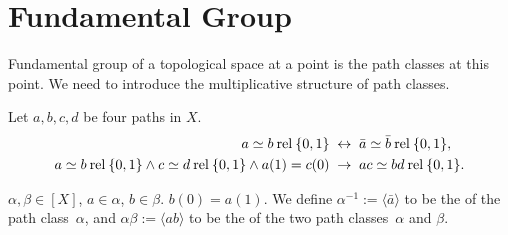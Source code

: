 \documentclass[openany, oneside, a5paper]{book}
\newcommand*{\rel}{\mathbin{\mathrm{rel}}}
\newcommand*{\pclass}[1]{\langle{#1}\rangle}    %
\begin{document}
\section{Fundamental Group}

Fundamental group of a topological space at a point is the path classes at this point.
We need to introduce the multiplicative structure of path classes.

\begin{theorem}
    Let $a, b, c, d$ be four paths in $X$.
    \begin{align*}
        a \simeq b \rel \{0, 1\} &\IFF \bar a \simeq \bar b \rel \{0, 1\}, \\
        a \simeq b \rel \{0, 1\} \wedge c \simeq d \rel \{0, 1\} \wedge a(1) = c(0) &\then ac \simeq bd \rel \{0, 1\}.
    \end{align*}
\end{theorem}

\begin{definition}
    $\alpha, \beta \in [X]$, $a \in \alpha$, $b \in \beta$.
    $b(0) = a(1)$.
    We define $\alpha^{-1} := \pclass{\bar a}$ to be the  of the path class~$\alpha$, and $\alpha \beta := \langle ab \rangle$ to be the  of the two path classes~$\alpha$ and $\beta$.
\end{definition}
\end{document}
